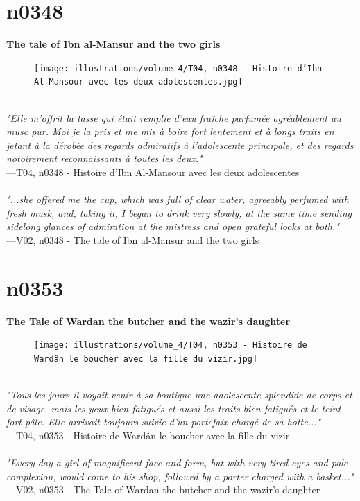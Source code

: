 \documentclass[../Carre_nights.tex]{subfiles}
\begin{document}
\section{n0348}
\textbf{\Large{The tale of Ibn al-Mansur and the two girls}} \\

\begin{figure}[ht]
\centering
\texttt{[image: illustrations/volume\_4/T04, n0348 - Histoire d’Ibn Al-Mansour avec les deux adolescentes.jpg]}
\end{figure}

\textit{\\
"Elle m’offrit la tasse qui était remplie d’eau fraîche parfumée agréablement au musc pur. Moi je la pris et me mis à boire fort lentement et à longs traits en jetant à la dérobée des regards admiratifs à l’adolescente principale, et des regards notoirement reconnaissants à toutes les deux."} \\
—T04, n0348 - Histoire d’Ibn Al-Mansour avec les deux adolescentes \\~\\
\textit{"...she offered me the cup, which was full of clear water, agreeably perfumed with fresh musk, and, taking it, I began to drink very slowly, at the same time sending sidelong glances of admiration at the mistress and open grateful looks at both."} \\
—V02, n0348 - The tale of Ibn al-Mansur and the two girls

\newpage

\section{n0353}
\textbf{\Large{The Tale of Wardan the butcher and the wazir’s daughter}} \\

\begin{figure}[ht]
\centering
\texttt{[image: illustrations/volume\_4/T04, n0353 - Histoire de Wardân le boucher avec la fille du vizir.jpg]}
\end{figure}

\textit{\\
"Tous les jours il voyait venir à sa boutique une adolescente splendide de corps et de visage, mais les yeux bien fatigués et aussi les traits bien fatigués et le teint fort pâle. Elle arrivait toujours suivie d’un portefaix chargé de sa hotte..."} \\
—T04, n0353 - Histoire de Wardân le boucher avec la fille du vizir \\~\\
\textit{"Every day a girl of magnificent face and form, but with very tired eyes and pale complexion, would come to his shop, followed by a porter charged with a basket..."} \\
—V02, n0353 - The Tale of Wardan the butcher and the wazir’s daughter
\end{document}
